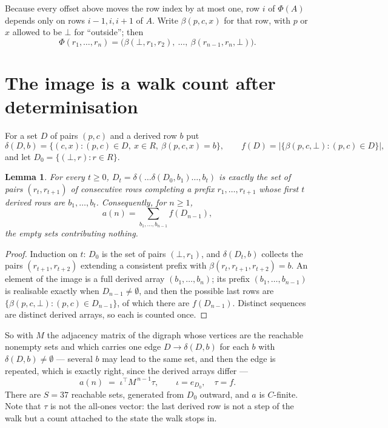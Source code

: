 \documentclass[11pt,a4paper]{article}
\theoremstyle{plain}
\newtheorem{lemma}[theorem]{Lemma}
\theoremstyle{definition}
\begin{document}
Because every offset above moves the row index by at most one, row $i$ of
$\Phi(A)$ depends only on rows $i-1,i,i+1$ of $A$. Write $\beta(p,c,x)$ for that row, with $p$
or $x$ allowed to be $\bot$ for ``outside''; then
\[
\Phi(r_1,\dots,r_n)=\bigl(\beta(\bot,r_1,r_2),\ \dots,\ \beta(r_{n-1},r_n,\bot)\bigr).
\]

\section{The image is a walk count after determinisation}

For a set $D$ of pairs $(p,c)$ and a derived row $b$ put
\[
\delta(D,b)=\{(c,x):(p,c)\in D,\ x\in R,\ \beta(p,c,x)=b\},\qquad
f(D)=\bigl|\{\beta(p,c,\bot):(p,c)\in D\}\bigr| ,
\]
and let $D_0=\{(\bot,r):r\in R\}$.

\begin{lemma}\label{lem:det}
For every $t\ge0$, $D_t=\delta(\dots\delta(D_0,b_1)\dots,b_t)$ is exactly the set of pairs
$(r_t,r_{t+1})$ of consecutive rows completing a prefix $r_1,\dots,r_{t+1}$ whose first $t$
derived rows are $b_1,\dots,b_t$. Consequently, for $n\ge1$,
\[
a(n)=\sum_{b_1,\dots,b_{n-1}}f(D_{n-1}),
\]
the empty sets contributing nothing.
\end{lemma}

\begin{proof}
Induction on $t$: $D_0$ is the set of pairs $(\bot,r_1)$, and $\delta(D_t,b)$ collects the
pairs $(r_{t+1},r_{t+2})$ extending a consistent prefix with
$\beta(r_t,r_{t+1},r_{t+2})=b$. An element of the image is a full derived array
$(b_1,\dots,b_n)$; its prefix $(b_1,\dots,b_{n-1})$ is realisable exactly when
$D_{n-1}\neq\emptyset$, and then the possible last rows are
$\{\beta(p,c,\bot):(p,c)\in D_{n-1}\}$, of which there are $f(D_{n-1})$. Distinct sequences
are distinct derived arrays, so each is counted once.
\end{proof}

So with $M$ the adjacency matrix of the digraph whose vertices are the reachable nonempty sets
and which carries one edge $D\to\delta(D,b)$ for each $b$ with $\delta(D,b)\neq\emptyset$ ---
several $b$ may lead to the same set, and then the edge is repeated, which is exactly right,
since the derived arrays differ ---
\[
a(n)\;=\;\iota^{\!\top}M^{\,n-1}\tau,\qquad \iota=e_{D_0},\quad \tau=f .
\]
There are $S=37$ reachable sets, generated from $D_0$ outward, and $a$ is $C$-finite.
Note that $\tau$ is not the all-ones vector: the last derived row is not a
step of the walk but a count attached to the state the walk stops in.
\end{document}
